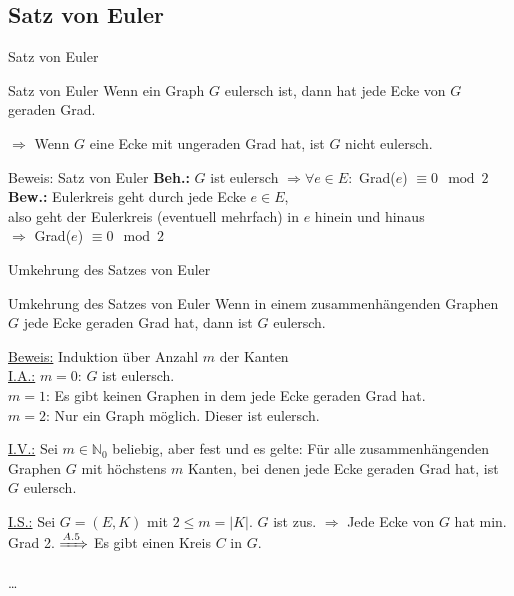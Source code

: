 \subsection{Satz von Euler}
\begin{frame}{Satz von Euler}
\begin{block}{Satz von Euler}
Wenn ein Graph $G$ eulersch ist, dann hat jede Ecke von $G$ geraden Grad.
\end{block}

\pause

$\Rightarrow$ Wenn $G$ eine Ecke mit ungeraden Grad hat, ist $G$ nicht eulersch.

\pause

\begin{gallery}
\end{gallery}
\end{frame}

\begin{frame}{Beweis: Satz von Euler}
\textbf{Beh.:} $G$ ist eulersch $\Rightarrow \forall e \in E: $ Grad($e$) $\equiv 0 \mod 2$ \pause \\
\textbf{Bew.:} Eulerkreis geht durch jede Ecke $e \in E$\pause,  \\
also geht der Eulerkreis (eventuell mehrfach) in $e$ hinein und hinaus \pause \\
$\Rightarrow$ Grad($e$) $\equiv 0 \mod 2$
\end{frame}

\begin{frame}{Umkehrung des Satzes von Euler}
\begin{block}{Umkehrung des Satzes von Euler}
Wenn in einem zusammenhängenden Graphen $G$ jede Ecke geraden Grad hat, dann 
ist $G$ eulersch.
\end{block}
\pause
\underline{Beweis:} Induktion über Anzahl $m$ der Kanten\\
\pause
\underline{I.A.:} $m=0$: $G$ ist eulersch. \cmark\\
\pause
$m=1$: Es gibt keinen Graphen in dem jede Ecke geraden Grad hat. \cmark\\
\pause
$m=2$: Nur ein Graph möglich. Dieser ist eulersch. \cmark\\ %
\pause

\underline{I.V.:} Sei $m \in \mathbb{N}_0$ beliebig, aber fest und 
es gelte: Für 
alle zusammenhängenden Graphen $G$ mit höchstens $m$ Kanten, bei 
denen jede Ecke geraden Grad hat, ist $G$ eulersch.

\pause

\underline{I.S.:} Sei $G=(E,K)$ mit $2 \leq m  = |K|$. $G$ ist zus. \pause
$\Rightarrow$ Jede Ecke von $G$ hat min. Grad 2. \pause
$\xRightarrow[]{A. 5}$ Es gibt einen Kreis $C$ in $G$.\pause

\dots

\end{frame}

